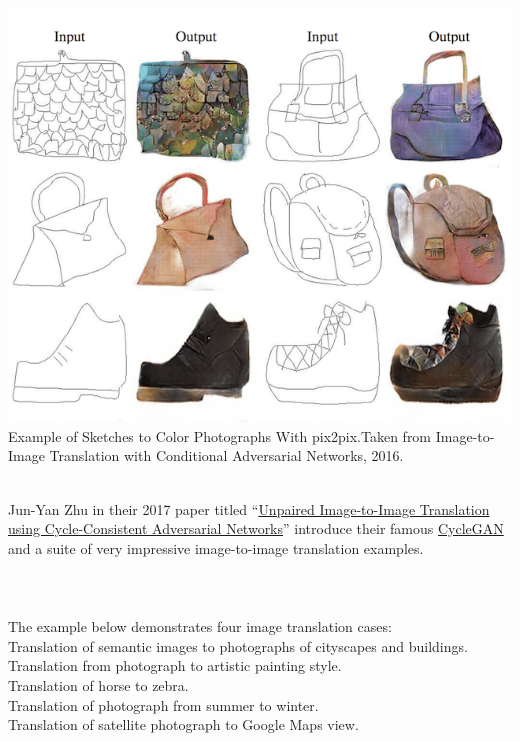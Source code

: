 \documentclass[14pt]{article}
\begin{document}
\begin{center}
    \includegraphics[width = 11 cm ]{11.png}
    Example of Sketches to Color Photographs With pix2pix.Taken from Image-to-Image Translation with Conditional Adversarial Networks, 2016.
\end{center}
\\
Jun-Yan Zhu in their 2017 paper titled “\hyperlink{https://arxiv.org/abs/1703.10593}{Unpaired Image-to-Image Translation using Cycle-Consistent Adversarial Networks}” introduce their famous \hyperlink{https://junyanz.github.io/CycleGAN/}{CycleGAN} and a suite of very impressive image-to-image translation examples.\\
\\
\\
\\
The example below demonstrates four image translation cases:\\
\hspace*{1cm}Translation of semantic images to photographs of cityscapes and buildings.
\\
\hspace*{1cm}Translation from photograph to artistic painting style.
\\
\hspace*{1cm}Translation of horse to zebra.\\
\hspace*{1cm}Translation of photograph from summer to winter.\\
\hspace*{1cm}Translation of satellite photograph to Google Maps view.\\
\end{document}

